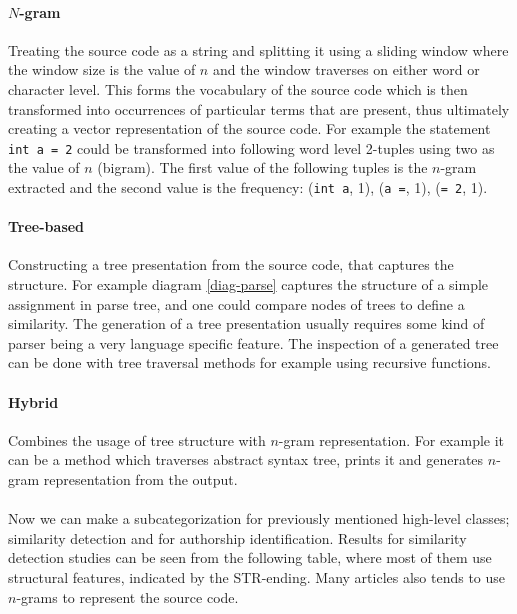 \paragraph{$N$-gram}
Treating the source code as a string and splitting it using a sliding window where the window size is the value of $n$ and the window traverses on either word or character level. This forms the vocabulary of the source code which is then transformed into occurrences of particular terms that are present, thus ultimately creating a vector representation of the source code. For example the statement \texttt{int a = 2} could be transformed into following word level 2-tuples using two as the value of $n$ (bigram). The first value of the following tuples is the $n$-gram extracted and the second value is the frequency: (\texttt{int a}, 1), (\texttt{a =}, 1), (\texttt{= 2}, 1). 

\paragraph{Tree-based}
Constructing a tree presentation from the source code, that captures the structure. For example diagram \ref{diag-parse} captures the structure of a simple assignment in parse tree, and one could compare \eg nodes of trees to define a similarity. The generation of a tree presentation usually requires some kind of parser being a very language specific feature. The inspection of a generated tree can be done with tree traversal methods for example using recursive functions. 

\paragraph{Hybrid}
Combines the usage of tree structure with $n$-gram representation. For example it can be a method which traverses abstract syntax tree, prints it and generates $n$-gram representation from the output.
\\\\
Now we can make a subcategorization for previously mentioned high-level classes; similarity detection and for authorship identification. Results for similarity detection studies can be seen from the following table, where most of them use structural features, indicated by the STR-ending. Many articles also tends to use $n$-grams to represent the source code.


